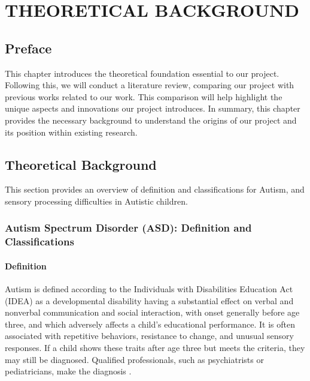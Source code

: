 \documentclass[a4paper,12pt]{report}
\begin{document}
\chapter{THEORETICAL BACKGROUND}

\section{Preface}

This chapter introduces the theoretical foundation essential to our project. Following this, we will conduct a literature review, comparing our project with previous works related to our work. This comparison will help highlight the unique aspects and innovations our project introduces. In summary, this chapter provides the necessary background to understand the origins of our project and its position within existing research.
\section{Theoretical Background}

This section provides an overview of definition and classifications for Autism, and sensory processing difficulties in Autistic children.

\subsection{Autism Spectrum Disorder (ASD): Definition and Classifications}
\subsubsection{Definition}
Autism is defined according to the Individuals with Disabilities Education Act (IDEA) as a developmental disability having a substantial effect on verbal and nonverbal communication and social interaction, with onset generally before age three, and which adversely affects a child's educational performance.  It is often associated with repetitive behaviors, resistance to change, and unusual sensory responses. If a child shows these traits after age three but meets the criteria, they may still be diagnosed. Qualified professionals, such as psychiatrists or pediatricians, make the diagnosis \cite{specialeducationguide_autism}.
\end{document}
